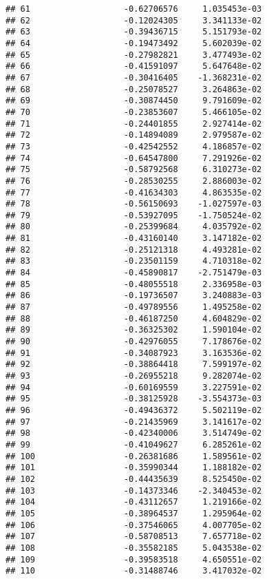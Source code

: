 \documentclass[
]{article}
\begin{document}
\begin{verbatim}
## 61                   -0.62706576     1.035453e-03
## 62                   -0.12024305     3.341133e-02
## 63                   -0.39436715     5.151793e-02
## 64                   -0.19473492     5.602039e-02
## 65                   -0.27982821     3.477493e-02
## 66                   -0.41591097     5.647648e-02
## 67                   -0.30416405    -1.368231e-02
## 68                   -0.25078527     3.264863e-02
## 69                   -0.30874450     9.791609e-02
## 70                   -0.23853607     5.466105e-02
## 71                   -0.24401855     2.927414e-02
## 72                   -0.14894089     2.979587e-02
## 73                   -0.42542552     4.186857e-02
## 74                   -0.64547800     7.291926e-02
## 75                   -0.58792568     6.310273e-02
## 76                   -0.28530255     2.886003e-02
## 77                   -0.41634303     4.863535e-02
## 78                   -0.56150693    -1.027597e-03
## 79                   -0.53927095    -1.750524e-02
## 80                   -0.25399684     4.035792e-02
## 81                   -0.43160140     3.147182e-02
## 82                   -0.25121318     4.493281e-02
## 83                   -0.23501159     4.710318e-02
## 84                   -0.45890817    -2.751479e-03
## 85                   -0.48055518     2.336958e-03
## 86                   -0.19736507     3.240883e-03
## 87                   -0.49789556     1.495258e-02
## 88                   -0.46187250     4.604829e-02
## 89                   -0.36325302     1.590104e-02
## 90                   -0.42976055     7.178676e-02
## 91                   -0.34087923     3.163536e-02
## 92                   -0.38864418     7.599197e-02
## 93                   -0.26955218     9.282074e-02
## 94                   -0.60169559     3.227591e-02
## 95                   -0.38125928    -3.554373e-03
## 96                   -0.49436372     5.502119e-02
## 97                   -0.21435969     3.141617e-02
## 98                   -0.42340006     3.514749e-02
## 99                   -0.41049627     6.285261e-02
## 100                  -0.26381686     1.589561e-02
## 101                  -0.35990344     1.188182e-02
## 102                  -0.44435639     8.525450e-02
## 103                  -0.14373346    -2.340453e-02
## 104                  -0.43112657     1.219166e-02
## 105                  -0.38964537     1.295964e-02
## 106                  -0.37546065     4.007705e-02
## 107                  -0.58708513     7.657718e-02
## 108                  -0.35582185     5.043538e-02
## 109                  -0.39583518     4.650551e-02
## 110                  -0.31488746     3.417032e-02

\end{verbatim}
\end{document}
